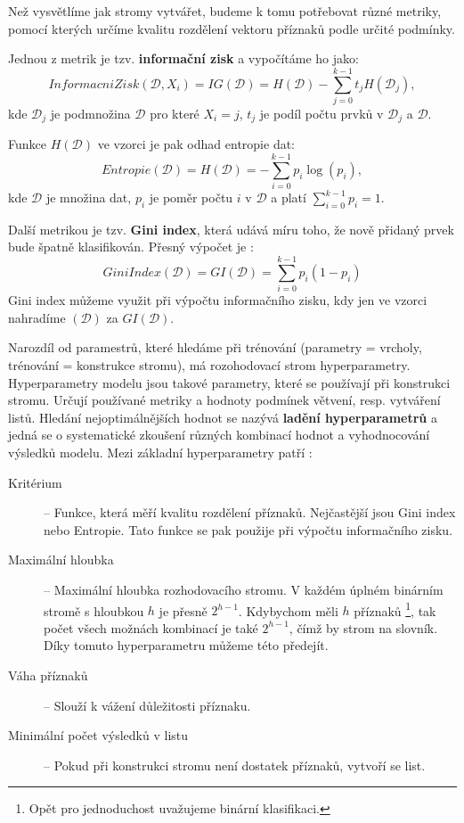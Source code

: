 Než vysvětlíme jak stromy vytvářet, budeme k tomu potřebovat různé metriky, pomocí kterých určíme kvalitu rozdělení vektoru příznaků podle určité podmínky.

Jednou z metrik je tzv. \textbf{informační zisk} a vypočítáme ho jako\cite{decisionTrees}:
\[
InformacniZisk(\mathcal{D},X_i) = IG(\mathcal{D}) = H(\mathcal{D}) - \sum^{k-1}_{j = 0} t_j  H(\mathcal{D}_j),
\]kde $\mathcal{D}_j$ je podmnožina $\mathcal{D}$ pro které $X_i = j$, $t_j$ je podíl počtu prvků v $\mathcal{D}_j$ a $\mathcal{D}$. 

Funkce $H(\mathcal{D})$ ve vzorci je pak odhad entropie dat:
\[
Entropie(\mathcal{D}) = H(\mathcal{D}) = - \sum^{k-1}_{i = 0} p_i  \log(p_i),
\]
kde $\mathcal{D}$ je množina dat, $p_i$ je  poměr počtu $i$ v $\mathcal{D}$ a platí $ \sum^{k-1}_{i = 0} p_i = 1$. 


Další metrikou je tzv. \textbf{Gini index}, která udává míru toho, že nově přidaný prvek bude špatně klasifikován. Přesný výpočet je \cite{vzd}:
\[
GiniIndex(\mathcal{D}) = GI(\mathcal{D}) = \sum^{k-1}_{i = 0} p_i  (1 - p_i) 
\]
Gini index můžeme využit při výpočtu informačního zisku, kdy jen ve vzorci nahradíme $(\mathcal{D})$ za  $GI(\mathcal{D})$.


Narozdíl od paramestrů, které hledáme při trénování (parametry = vrcholy, trénování = konstrukce stromu),  má rozohodovací strom hyperparametry. Hyperparametry modelu jsou takové parametry, které se používají při konstrukci stromu. Určují používané metriky a hodnoty podmínek větvení, resp. vytváření listů. Hledání nejoptimálnějších hodnot se nazývá \textbf{ladění hyperparametrů} a jedná se o systematické zkoušení různých kombinací hodnot a vyhodnocování výsledků modelu. Mezi základní hyperparametry patří \cite{scikit-learn}:
\begin{description}
\item[Kritérium] -- Funkce, která měří kvalitu rozdělení příznaků. Nejčastější jsou Gini index nebo Entropie. Tato funkce se pak použije při výpočtu informačního zisku.
\item[Maximální hloubka] -- Maximální hloubka rozhodovacího stromu. V každém úplném binárním stromě s hloubkou $h$ je přesně $2^{h-1}$. Kdybychom měli $h$ příznaků \footnote{Opět pro jednoduchost uvažujeme binární klasifikaci.}, tak počet všech možnách kombinací je také $2^{h-1}$, čímž by strom  na slovník. Díky tomuto hyperparametru můžeme této  předejít.
\item[Váha příznaků] -- Slouží k vážení důležitosti příznaku.
\item[Minimální počet výsledků v listu] --  Pokud při konstrukci stromu není dostatek příznaků, vytvoří se list.
\end{description} 


